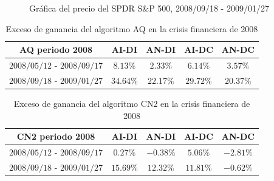 \documentclass[12pt]{report}
\theoremstyle{break}
\theoremstyle{break}
\begin{document}
\begin{figure}[htbp]
\centering
{}
\caption{\label{imagen:sp500-2008-09-18} Gráfica del precio del SPDR S\&P 500, 2008/09/18 - 2009/01/27}
\end{figure}

\begin{center}
\begin{table}[htbp]
\centering
\begin{tabular}{ccccc}
\hline
\textbf{AQ periodo 2008} & \textbf{AI-DI} & \textbf{AN-DI} & \textbf{AI-DC} & \textbf{AN-DC} \\
\hline
$2008/05/12$ - $2008/09/17$ & $8.13\%$ & $2.33\%$ & $6.14\%$ & $3.57\%$ \\
$2008/09/18$ - $2009/01/27$ & $34.64\%$ & $22.17\%$ & $29.72\%$ & $20.37	\%$  \\
\hline
\end{tabular}
\caption{\label{tabla:AQ-SP500-2008} Exceso de ganancia del algoritmo AQ en la crisis financiera de 2008}
\end{table}
\end{center}

\begin{center}
\begin{table}[htbp]
\centering
\begin{tabular}{ccccc}
\hline
\textbf{CN2 periodo 2008} & \textbf{AI-DI} & \textbf{AN-DI} & \textbf{AI-DC} & \textbf{AN-DC} \\
\hline
$2008/05/12$ - $2008/09/17$ & $0.27\%$ & $-0.38\%$ & $5.06\%$ & $-2.81\%$ \\
$2008/09/18$ - $2009/01/27$ & $15.69\%$ & $12.32\%$ & $11.81\%$ & $-0.62\%$  \\
\hline
\end{tabular}
\caption{\label{tabla:CN2-SP500-2008} Exceso de ganancia del algoritmo CN2 en la crisis financiera de 2008}
\end{table}
\end{center}
\end{document}
